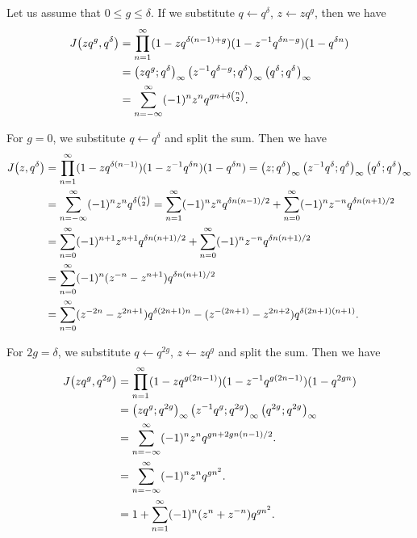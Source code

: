 \documentclass{article}
\begin{document}
Let us assume that $0 \le g \le \delta$.
If we substitute $q \gets q^\delta$, $z \gets z q^g$, then we have
\begin{align*}
  \jacobiFunction{zq^g}{q^\delta}
  &=
  \prod_{n=1}^\infty
    (1-zq^{\delta (n-1)+g})
    (1-z^{-1}q^{\delta n-g})
    (1-q^{\delta n})
  \\
  &=
    \qPochhammer{zq^g}{q^\delta} \qPochhammer{z^{-1}q^{\delta-g}}{q^\delta}
    \eulerFunction[q^\delta]{}
  \\
  &=
    \sum_{n=-\infty}^\infty (-1)^nz^nq^{gn + \delta \binom{n}{2}}.
\end{align*}

For $g=0$, we substitute $q \gets q^\delta$ and split the sum. Then we have
\begin{align}
  \jacobiFunction{z}{q^\delta}
  &=
  \prod_{n=1}^\infty
    (1-zq^{\delta (n-1)})
    (1-z^{-1}q^{\delta n})
    (1-q^{\delta n})
  =
    \qPochhammer{z}{q^\delta} \qPochhammer{z^{-1}q^{\delta}}{q^\delta}
    \eulerFunction[q^\delta]{}
  \notag\\
  &=
    \sum_{n=-\infty}^\infty (-1)^nz^nq^{\delta \binom{n}{2}}
    =
    \sum_{n=1}^\infty (-1)^nz^nq^{\delta n(n-1)/2}
    +
    \sum_{n=0}^\infty (-1)^nz^{-n}q^{\delta n(n+1)/2}
  \notag\\
  &=
    \sum_{n=0}^\infty (-1)^{n+1}z^{n+1}q^{\delta n(n+1)/2}
    +
    \sum_{n=0}^\infty (-1)^nz^{-n}q^{\delta n(n+1)/2}
  \notag\\
  &=
    \sum_{n=0}^\infty (-1)^n(z^{-n}-z^{n+1})q^{\delta n(n+1)/2}
  \\
  &=
    \sum_{n=0}^\infty (z^{-2n}-z^{2n+1})q^{\delta (2n+1) n}
                   -(z^{-(2n+1)}-z^{2n+2})q^{\delta (2n+1) (n+1)}.
  \label{eq:Jacobi-g=0}
\end{align}

For $2g=\delta$, we substitute $q \gets q^{2g}$, $z \gets z q^g$ and
split the sum. Then we have
\begin{align}
  \jacobiFunction{zq^g}{q^{2g}}
  &=
  \prod_{n=1}^\infty
    (1-zq^{g(2n-1)})
    (1-z^{-1}q^{g(2n-1)})
    (1-q^{2 g n})
  \notag\\
  &=
    \qPochhammer{zq^g}{q^{2g}} \qPochhammer{z^{-1}q^g}{q^{2g}}
    \eulerFunction[q^{2g}]{}
  \notag\\
  &=
    \sum_{n=-\infty}^\infty (-1)^nz^nq^{gn + 2g n (n-1)/2}.
  \notag\\
  &=
    \sum_{n=-\infty}^\infty (-1)^nz^nq^{gn^2}.
  \\
  &=
    1 + \sum_{n=1}^\infty (-1)^n(z^n + z^{-n})q^{gn^2}.
  \label{eq:Jacobi-2g=delta}
\end{align}
\end{document}

